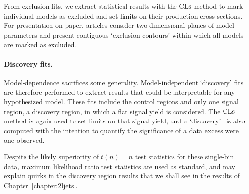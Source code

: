 From exclusion fits, we extract statistical results with the $\mathrm{CLs}$ method to
mark individual models as excluded and set limits on their production
cross-sections.
For presentation on paper, articles consider two-dimensional planes of model
parameters and present contiguous `exclusion contours' within which all models
are marked as excluded.

\paragraph{Discovery fits.}
Model-dependence sacrifices some generality.
Model-independent `discovery' fits are therefore performed to extract results
that could be interpretable for any hypothesized model.
These fits include the control regions and only one signal region, a
discovery region, in which a flat signal yield is considered.
The $\mathrm{CLs}$ method is again used to set limits on that signal yield,
and a `discovery' \pvalue\ is also computed with the intention to quantify
the significance of a data excess were one observed.

Despite the likely superiority of $t(n) = n$ test statistics for these
single-bin data, maximum likelihood ratio test statistics are used as standard,
and may explain quirks in the discovery region results that we shall see in the
results of Chapter~\ref{chapter:2ljets}.

